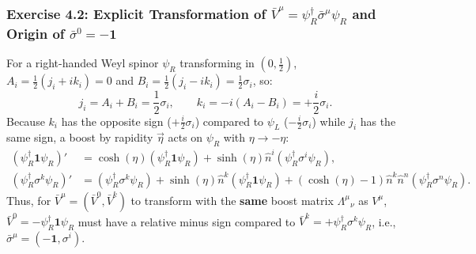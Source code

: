 \documentclass[11pt,a4paper]{article}
\begin{document}
\subsubsection{Exercise 4.2: Explicit Transformation of $\bar{V}^\mu = \psi_R^\dagger \bar{\sigma}^\mu \psi_R$ and Origin of $\bar{\sigma}^0 = -\mathbf{1}$}
For a right-handed Weyl spinor $\psi_R$ transforming in $(0,\frac{1}{2})$, $A_i = \frac{1}{2}(j_i + ik_i) = 0$ and $B_i = \frac{1}{2}(j_i - ik_i) = \frac{1}{2}\sigma_i$, so:
\begin{equation}
    j_i = A_i + B_i = \frac{1}{2}\sigma_i, \qquad k_i = -i(A_i - B_i) = +\frac{i}{2}\sigma_i.
\end{equation}
Because $k_i$ has the opposite sign ($+\frac{i}{2}\sigma_i$) compared to $\psi_L$ ($-\frac{i}{2}\sigma_i$) while $j_i$ has the same sign, a boost by rapidity $\vec{\eta}$ acts on $\psi_R$ with $\eta \to -\eta$:
\begin{align}
    (\psi_R^\dagger \mathbf{1} \psi_R)' &= \cosh(\eta)(\psi_R^\dagger \mathbf{1} \psi_R) + \sinh(\eta)\hat{n}^i(\psi_R^\dagger \sigma^i \psi_R), \\
    (\psi_R^\dagger \sigma^k \psi_R)' &= (\psi_R^\dagger \sigma^k \psi_R) + \sinh(\eta)\hat{n}^k(\psi_R^\dagger \mathbf{1} \psi_R) + (\cosh(\eta)-1)\hat{n}^k \hat{n}^n(\psi_R^\dagger \sigma^n \psi_R).
\end{align}
Thus, for $\bar{V}^\mu = (\bar{V}^0, \bar{V}^k)$ to transform with the \textbf{same} boost matrix $\Lambda^\mu{}_\nu$ as $V^\mu$, $\bar{V}^0 = -\psi_R^\dagger \mathbf{1} \psi_R$ must have a relative minus sign compared to $\bar{V}^k = +\psi_R^\dagger \sigma^k \psi_R$, i.e., $\bar{\sigma}^\mu = (-\mathbf{1}, \sigma^i)$.
\end{document}
